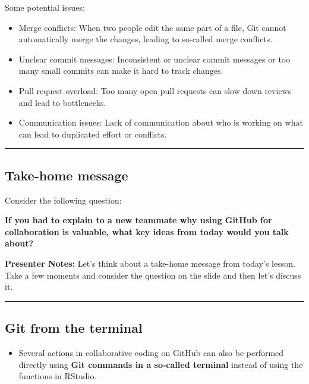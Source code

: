 \documentclass[
  letterpaper,
  DIV=11,
  numbers=noendperiod]{scrartcl}
\providecommand{\tightlist}{%
  \setlength{\itemsep}{0pt}\setlength{\parskip}{0pt}}
\begin{document}
Some potential issues:

\begin{itemize}
\item
  Merge conflicts: When two people edit the same part of a file, Git
  cannot automatically merge the changes, leading to so-called merge
  conflicts.
\item
  Unclear commit messages: Inconsistent or unclear commit messages or
  too many small commits can make it hard to track changes.
\item
  Pull request overload: Too many open pull requests can slow down
  reviews and lead to bottlenecks.
\item
  Communication issues: Lack of communication about who is working on
  what can lead to duplicated effort or conflicts.
\end{itemize}

\begin{center}\rule{0.5\linewidth}{0.5pt}\end{center}

\subsection{Take-home message}\label{take-home-message}

Consider the following question:

\textbf{If you had to explain to a new teammate why using GitHub for
collaboration is valuable, what key ideas from today would you talk
about?}

\textbf{Presenter Notes:} Let's think about a take-home message from
today's lesson. Take a few moments and consider the question on the
slide and then let's discuss it.

\begin{center}\rule{0.5\linewidth}{0.5pt}\end{center}

\subsection{Git from the terminal}\label{git-from-the-terminal}

\begin{itemize}
\tightlist
\item
  Several actions in collaborative coding on GitHub can also be
  performed directly using \textbf{Git commands in a so-called terminal}
  instead of using the functions in RStudio.
\end{itemize}
\end{document}
